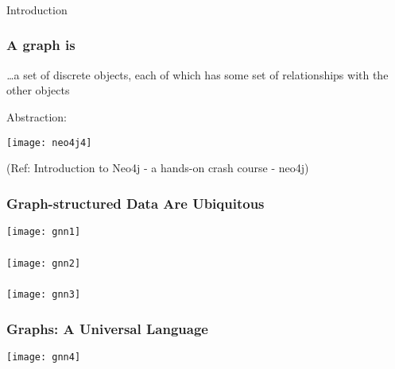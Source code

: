 \begin{frame}[fragile]\frametitle{}
\begin{center}
{\Large Introduction}
\end{center}
\end{frame}


\begin{frame}\frametitle{A graph is}
{\emph \ldots a set of discrete objects, each of which has some set of relationships with the other objects}

Abstraction:

\begin{center}
\texttt{[image: neo4j4]}
\end{center}	  

{\tiny (Ref: Introduction to Neo4j - a hands-on crash course - neo4j)}
\end{frame}

\begin{frame}[fragile]\frametitle{ Graph-structured Data Are Ubiquitous }

\begin{center}
\texttt{[image: gnn1]}
\end{center}	  

\end{frame}

\begin{frame}[fragile]\frametitle{}

\begin{center}
\texttt{[image: gnn2]}
\end{center}	  

\end{frame}

\begin{frame}[fragile]\frametitle{}

\begin{center}
\texttt{[image: gnn3]}
\end{center}	  

\end{frame}

\begin{frame}[fragile]\frametitle{Graphs: A Universal Language }

\begin{center}
\texttt{[image: gnn4]}
\end{center}	  

\end{frame}


